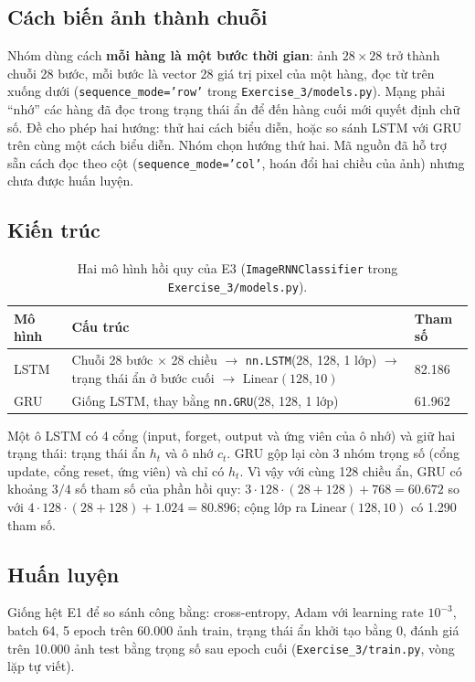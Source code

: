 \documentclass[12pt]{article}
\newcommand{\code}[1]{\texttt{#1}}
\newcommand{\st}[1]{\textbf{#1}}
\begin{document}
\subsection{Cách biến ảnh thành chuỗi}
Nhóm dùng cách \st{mỗi hàng là một bước thời gian}: ảnh $28\times28$ trở thành chuỗi 28 bước, mỗi bước là vector 28 giá
trị pixel của một hàng, đọc từ trên xuống dưới (\code{sequence\_mode='row'} trong \code{Exercise\_3/models.py}). Mạng phải
``nhớ'' các hàng đã đọc trong trạng thái ẩn để đến hàng cuối mới quyết định chữ số. Đề cho phép hai hướng: thử hai cách biểu
diễn, hoặc so sánh LSTM với GRU trên cùng một cách biểu diễn. Nhóm chọn hướng thứ hai. Mã nguồn đã hỗ trợ sẵn cách đọc theo
cột (\code{sequence\_mode='col'}, hoán đổi hai chiều của ảnh) nhưng chưa được huấn luyện.

\subsection{Kiến trúc}
\begin{table}[H]
\centering
\caption{Hai mô hình hồi quy của E3 (\code{ImageRNNClassifier} trong \code{Exercise\_3/models.py}).}\label{tab:e3-models}
\begin{tabularx}{\linewidth}{@{}P{1.6cm}LR{2.2cm}@{}}
\toprule
Mô hình & Cấu trúc & Tham số \\\midrule
LSTM & Chuỗi 28 bước $\times$ 28 chiều $\rightarrow$ \code{nn.LSTM}(28, 128, 1 lớp) $\rightarrow$ trạng thái ẩn ở bước cuối $\rightarrow$ Linear$(128, 10)$ & 82.186 \\
GRU & Giống LSTM, thay bằng \code{nn.GRU}(28, 128, 1 lớp) & 61.962 \\
\bottomrule
\end{tabularx}
\end{table}

Một ô LSTM có 4 cổng (input, forget, output và ứng viên của ô nhớ) và giữ hai trạng thái: trạng thái ẩn $h_t$ và ô nhớ $c_t$.
GRU gộp lại còn 3 nhóm trọng số (cổng update, cổng reset, ứng viên) và chỉ có $h_t$. Vì vậy với cùng 128 chiều ẩn, GRU có
khoảng $3/4$ số tham số của phần hồi quy: $3 \cdot 128 \cdot (28 + 128) + 768 = 60.672$ so với
$4 \cdot 128 \cdot (28 + 128) + 1.024 = 80.896$; cộng lớp ra Linear$(128,10)$ có 1.290 tham số.

\subsection{Huấn luyện}
Giống hệt E1 để so sánh công bằng: cross-entropy, Adam với learning rate $10^{-3}$, batch 64, 5 epoch trên 60.000 ảnh
train, trạng thái ẩn khởi tạo bằng 0, đánh giá trên 10.000 ảnh test bằng trọng số sau epoch cuối (\code{Exercise\_3/train.py},
vòng lặp tự viết).
\end{document}
